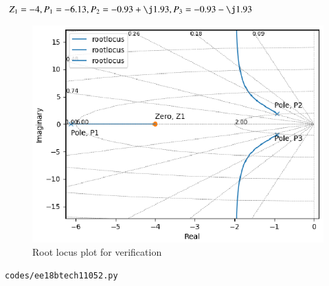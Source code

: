 \begin{enumerate}[label=\thesection.\arabic*.,ref=\thesection.\theenumi]
$Z_{1}=-4, P_{1}=-6.13, P_{2}=-0.93+\j1.93, P_{3}=-0.93-\j1.93$


\begin{figure}
\centering
\includegraphics[width=\columnwidth]{figs/ee18btech11052.eps}
\caption{Root locus plot for verification}
\end{figure}


\begin{lstlisting}
codes/ee18btech11052.py
\end{lstlisting}
    
\end{enumerate}

